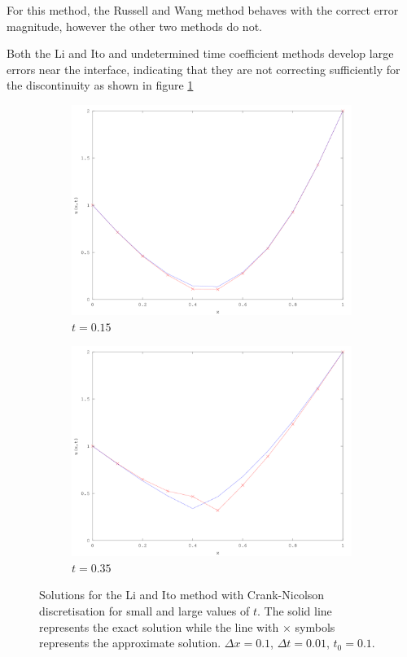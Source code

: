 For this method, the Russell and Wang method behaves with the correct error magnitude, however the other two methods do not.

Both the Li and Ito and undetermined time coefficient methods develop large errors near the interface, indicating that they are not correcting sufficiently for the discontinuity as shown in figure \ref{fig:LiItoHeat}

\begin{figure}[p]
    \centering
    \begin{subfigure}[b]{0.85\textwidth}
        \includegraphics[width=\textwidth]{diagrams/LiItoSmallt}
        \caption{$t=0.15$}
    \end{subfigure}
    \begin{subfigure}[b]{0.85\textwidth}
        \includegraphics[width=\textwidth]{diagrams/LiItoLarget}
        \caption{$t=0.35$}
    \end{subfigure}
    \caption{Solutions for the Li and Ito method with Crank-Nicolson discretisation for small and large values of $t$.
    The solid line represents the exact solution while the line with $\times$  symbols represents the approximate solution.
    $\Delta x = 0.1$, $\Delta t = 0.01$, $t_0 = 0.1$.}
    \label{fig:LiItoHeat}
\end{figure}
